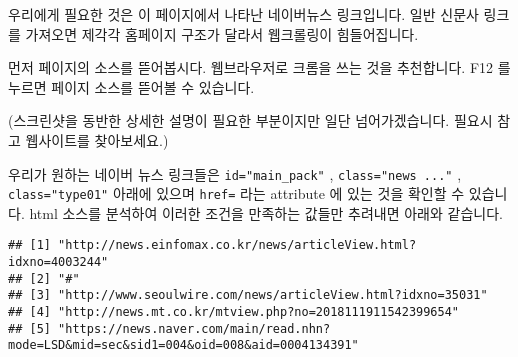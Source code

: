 \documentclass[]{article}
\newenvironment{Shaded}{\begin{snugshade}}{\end{snugshade}}
\newcommand{\CommentTok}[1]{\textcolor[rgb]{0.56,0.35,0.01}{\textit{#1}}}
\newcommand{\DataTypeTok}[1]{\textcolor[rgb]{0.13,0.29,0.53}{#1}}
\newcommand{\DecValTok}[1]{\textcolor[rgb]{0.00,0.00,0.81}{#1}}
\newcommand{\KeywordTok}[1]{\textcolor[rgb]{0.13,0.29,0.53}{\textbf{#1}}}
\newcommand{\NormalTok}[1]{#1}
\newcommand{\OperatorTok}[1]{\textcolor[rgb]{0.81,0.36,0.00}{\textbf{#1}}}
\newcommand{\StringTok}[1]{\textcolor[rgb]{0.31,0.60,0.02}{#1}}
\begin{document}
우리에게 필요한 것은 이 페이지에서 나타난 네이버뉴스 링크입니다. 일반
신문사 링크를 가져오면 제각각 홈페이지 구조가 달라서 웹크롤링이
힘들어집니다.

먼저 페이지의 소스를 뜯어봅시다. 웹브라우저로 크롬을 쓰는 것을
추천합니다. F12 를 누르면 페이지 소스를 뜯어볼 수 있습니다.

(스크린샷을 동반한 상세한 설명이 필요한 부분이지만 일단 넘어가겠습니다.
필요시 참고 웹사이트를 찾아보세요.)

우리가 원하는 네이버 뉴스 링크들은 \texttt{id="main\_pack"} ,
\texttt{class="news\ ..."} , \texttt{class="type01"} 아래에 있으며
\texttt{href=} 라는 attribute 에 있는 것을 확인할 수 있습니다. html
소스를 분석하여 이러한 조건을 만족하는 값들만 추려내면 아래와 같습니다.

\begin{Shaded}
\end{Shaded}

\begin{verbatim}
## [1] "http://news.einfomax.co.kr/news/articleView.html?idxno=4003244"                       
## [2] "#"                                                                                    
## [3] "http://www.seoulwire.com/news/articleView.html?idxno=35031"                           
## [4] "http://news.mt.co.kr/mtview.php?no=2018111911542399654"                               
## [5] "https://news.naver.com/main/read.nhn?mode=LSD&mid=sec&sid1=004&oid=008&aid=0004134391"
\end{verbatim}
\end{document}
